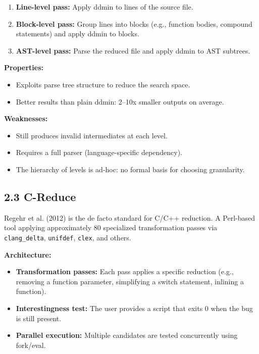 \documentclass[
  letterpaper,
]{article}
\providecommand{\tightlist}{%
  \setlength{\itemsep}{0pt}\setlength{\parskip}{0pt}}
\begin{document}
\begin{enumerate}
\def\labelenumi{\arabic{enumi}.}
\tightlist
\item
  \textbf{Line-level pass:} Apply ddmin to lines of the source file.
\item
  \textbf{Block-level pass:} Group lines into blocks (e.g., function
  bodies, compound statements) and apply ddmin to blocks.
\item
  \textbf{AST-level pass:} Parse the reduced file and apply ddmin to AST
  subtrees.
\end{enumerate}

\textbf{Properties:}

\begin{itemize}
\tightlist
\item
  Exploits parse tree structure to reduce the search space.
\item
  Better results than plain ddmin: 2--10x smaller outputs on average.
\end{itemize}

\textbf{Weaknesses:}

\begin{itemize}
\tightlist
\item
  Still produces invalid intermediates at each level.
\item
  Requires a full parser (language-specific dependency).
\item
  The hierarchy of levels is ad-hoc: no formal basis for choosing
  granularity.
\end{itemize}

\subsection{2.3 C-Reduce}\label{c-reduce}

Regehr et al. (2012) is the de facto standard for C/C++ reduction. A
Perl-based tool applying approximately 80 specialized transformation
passes via \texttt{clang\_delta}, \texttt{unifdef}, \texttt{clex}, and
others.

\textbf{Architecture:}

\begin{itemize}
\tightlist
\item
  \textbf{Transformation passes:} Each pass applies a specific reduction
  (e.g., removing a function parameter, simplifying a switch statement,
  inlining a function).
\item
  \textbf{Interestingness test:} The user provides a script that exits 0
  when the bug is still present.
\item
  \textbf{Parallel execution:} Multiple candidates are tested
  concurrently using fork/eval.
\end{itemize}
\end{document}
